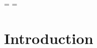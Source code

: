 \documentclass[a4paper,10pt]{article}
\begin{document}
\title{}
\author{Jason Cairns}
 \month= \day=
\maketitle

\section{Introduction}
\label{sec:}


\printbibliography{}
\end{document}

